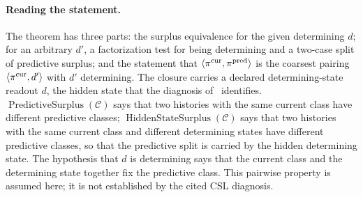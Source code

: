 \paragraph{Reading the statement.} The theorem has three parts: the surplus equivalence for the given determining \(d\); for an arbitrary \(d'\), a factorization test for being determining and a two-case split of predictive surplus; and the statement that \(\langle\pi^{\mathrm{cur}},\pi^{\mathrm{pred}}\rangle\) is the coarsest pairing \(\langle\pi^{\mathrm{cur}},d'\rangle\) with \(d'\) determining.
The closure carries a declared determining-state readout \(d\), the hidden
state that the diagnosis of \PaperCSL\ identifies.
\(\operatorname{PredictiveSurplus}(\mathcal C)\) says that two histories with
the same current class have different predictive classes;
\(\operatorname{HiddenStateSurplus}(\mathcal C)\) says that two histories with
the same current class and different determining states have different
predictive classes, so that the predictive split is carried by the hidden
determining state. The hypothesis that \(d\) is determining says that the
current class and the determining state together fix the predictive class.
This pairwise property is assumed here; it is not established by the cited CSL
diagnosis.

